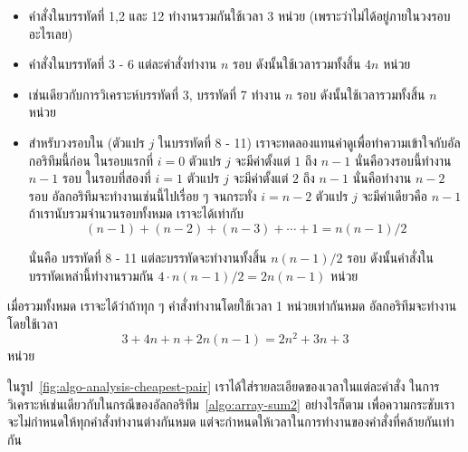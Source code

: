 \begin{itemize}
\item คำสั่ง{\wbr}ใน{\wbr}บรรทัด{\wbr}ที่ 1,2 และ 12 ทำงาน{\wbr}รวม{\wbr}กัน{\wbr}ใช้เวลา 3 หน่วย (เพราะว่า{\wbr}ไม่{\wbr}ได้{\wbr}อยู่{\wbr}ภายใน{\wbr}วงรอบ{\wbr}อะไร{\wbr}เลย)
\item คำสั่ง{\wbr}ใน{\wbr}บรรทัด{\wbr}ที่ 3 - 6 แต่ละ{\wbr}คำสั่ง{\wbr}ทำงาน $n$ รอบ ดังนั้น{\wbr}ใช้เวลา{\wbr}รวม{\wbr}ทั้งสิ้น $4n$ หน่วย{\wbr}
\item เช่นเดียวกับ{\wbr}การ{\wbr}วิเคราะห์{\wbr}บรรทัด{\wbr}ที่ 3, บรรทัด{\wbr}ที่ 7 ทำงาน $n$ รอบ{\wbr}
  ดังนั้น{\wbr}ใช้เวลา{\wbr}รวม{\wbr}ทั้งสิ้น $n$ หน่วย{\wbr}
\item สำหรับ{\wbr}วงรอบ{\wbr}ใน (ตัวแปร $j$ ใน{\wbr}บรรทัด{\wbr}ที่ 8 - 11)
เรา{\wbr}จะ{\wbr}ทดลอง{\wbr}แทน{\wbr}ค่า{\wbr}ดู{\wbr}เพื่อ{\wbr}ทำ{\wbr}ความ{\wbr}เข้าใจ{\wbr}กับ{\wbr}อัล{\wbr}กอ{\wbr}ริ{\wbr}ทึม{\wbr}นี้{\wbr}ก่อน ใน{\wbr}รอบ{\wbr}แรก{\wbr}ที่ $i=0$ ตัวแปร $j$
จะ{\wbr}มี{\wbr}ค่า{\wbr}ตั้งแต่ $1$ ถึง $n-1$ นั่น{\wbr}คือ{\wbr}วงรอบ{\wbr}นี้{\wbr}ทำงาน $n-1$ รอบ ใน{\wbr}รอบ{\wbr}ที่{\wbr}สอง{\wbr}ที่ $i=1$
ตัวแปร $j$ จะ{\wbr}มี{\wbr}ค่า{\wbr}ตั้งแต่ $2$ ถึง $n-1$ นั่น{\wbr}คือ{\wbr}ทำงาน $n-2$ รอบ{\wbr}
อัล{\wbr}กอ{\wbr}ริ{\wbr}ทึม{\wbr}จะ{\wbr}ทำงาน{\wbr}เช่นนี้{\wbr}ไป{\wbr}เรื่อย ๆ จนกระทั่ง $i=n-2$ ตัวแปร $j$ จะ{\wbr}มี{\wbr}ค่า{\wbr}เดียว{\wbr}คือ $n-1$
ถ้า{\wbr}เรา{\wbr}นับ{\wbr}รวม{\wbr}จำนวน{\wbr}รอบ{\wbr}ทั้งหมด เรา{\wbr}จะ{\wbr}ได้{\wbr}เท่า{\wbr}กับ{\wbr}
\[
(n-1) + (n-2) + (n-3) +\cdots+1 = n(n-1)/2
\]

นั่น{\wbr}คือ บรรทัด{\wbr}ที่ 8 - 11 แต่ละ{\wbr}บรรทัด{\wbr}จะ{\wbr}ทำงาน{\wbr}ทั้งสิ้น $n(n-1)/2$ รอบ{\wbr}
ดังนั้น{\wbr}คำสั่ง{\wbr}ใน{\wbr}บรรทัด{\wbr}เหล่านี้{\wbr}ทำงาน{\wbr}รวม{\wbr}กัน $4\cdot n(n-1)/2=2n(n-1)$ หน่วย{\wbr}
\end{itemize}

เมื่อ{\wbr}รวม{\wbr}ทั้งหมด เรา{\wbr}จะ{\wbr}ได้{\wbr}ว่า{\wbr}ถ้า{\wbr}ทุก ๆ คำสั่ง{\wbr}ทำงาน{\wbr}โดย{\wbr}ใช้เวลา 1 หน่วย{\wbr}เท่า{\wbr}กัน{\wbr}หมด อัล{\wbr}กอ{\wbr}ริ{\wbr}ทึม{\wbr}จะ{\wbr}ทำงาน{\wbr}โดย{\wbr}ใช้เวลา{\wbr}
\[
3 + 4n + n + 2n(n-1) = 2n^2 + 3n + 3
\]
หน่วย{\wbr}

ใน{\wbr}รูป~\ref{fig:algo-analysis-cheapest-pair}
เรา{\wbr}ได้{\wbr}ใส่{\wbr}รายละเอียด{\wbr}ของ{\wbr}เวลา{\wbr}ใน{\wbr}แต่ละ{\wbr}คำสั่ง{\wbr}
ใน{\wbr}การ{\wbr}วิเคราะห์{\wbr}เช่นเดียวกับ{\wbr}ใน{\wbr}กรณี{\wbr}ของ{\wbr}อัล{\wbr}กอ{\wbr}ริ{\wbr}ทึม~\ref{algo:array-sum2} อย่างไรก็ตาม{\wbr}
เพื่อ{\wbr}ความ{\wbr}กระชับ{\wbr}เรา{\wbr}จะ{\wbr}ไม่{\wbr}กำหนด{\wbr}ให้{\wbr}ทุก{\wbr}คำสั่ง{\wbr}ทำงาน{\wbr}ต่าง{\wbr}กัน{\wbr}หมด{\wbr}
แต่{\wbr}จะ{\wbr}กำหนด{\wbr}ให้{\wbr}เวลา{\wbr}ใน{\wbr}การ{\wbr}ทำงาน{\wbr}ของ{\wbr}คำสั่ง{\wbr}ที่{\wbr}คล้าย{\wbr}กัน{\wbr}เท่า{\wbr}กัน{\wbr}

